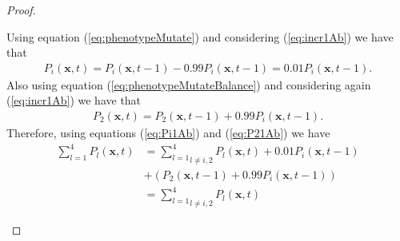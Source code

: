 \documentclass[\main/thesis.tex]{subfiles}
\begin{document}
\begin{proof}
\begin{itemize}
\begin{itemize}
\begin{itemize}
                           	                        Using equation (\ref{eq:phenotypeMutate}) and considering 
                           	                        (\ref{eq:incr1Ab}) we have that
                                                    \begin{align*}
                           	                          P_i(\boldsymbol{x}, t) {=} P_i(\boldsymbol{x}, t{-}1)
                           	                                                 {-} 0.99 P_i(\boldsymbol{x}, t{-}1)
                           	                                                 {=} 0.01 P_i(\boldsymbol{x}, t{-} 1).
                           	                          \tag{5}
                           	                          \label{eq:Pi1Ab}
                           	                        \end{align*}
                           	                        Also using equation (\ref{eq:phenotypeMutateBalance}) and considering 
                           	                        again (\ref{eq:incr1Ab}) we have that
                           	                        \begin{align*}
                           	                          P_2(\boldsymbol{x}, t) {=} P_2(\boldsymbol{x}, t{-}1) 
                           	                                                 {+} 0.99 P_i(\boldsymbol{x}, t{-}1).
                                                      \tag{6}
                           	                          \label{eq:P21Ab}
                           	                        \end{align*}
                           	                        Therefore, using equations (\ref{eq:Pi1Ab}) and (\ref{eq:P21Ab}) we 
                           	                        have 
                           	                        \begin{align*}
                           	                          \sum_{l{=}1}^4 P_l(\boldsymbol{x}, t) 
                           	                          &{=} \underset{l {\ne} i, 2}{\sum_{l{=}1}^4} P_l(\boldsymbol{x}, t)
                           	                           {+} 0.01 P_i(\boldsymbol{x}, t{-} 1)\\
                           	                          &{+} (P_2(\boldsymbol{x}, t{-}1) {+} 0.99 P_i(\boldsymbol{x}, t{-}1))
                           	                          \\
                           	                          &{=} \underset{l {\ne} i, 2}{\sum_{l{=}1}^4} P_l(\boldsymbol{x}, t)

\end{align*}
\end{itemize}
\end{itemize}
\end{itemize}
\end{proof}
\end{document}
